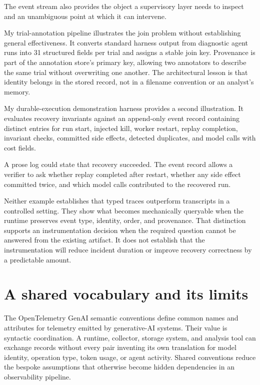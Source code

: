 The event stream also provides the object a supervisory layer needs to inspect and an unambiguous point at which it can intervene.

My trial-annotation pipeline illustrates the join problem without establishing general effectiveness. It converts standard harness output from diagnostic agent runs into 31 structured fields per trial and assigns a stable join key. Provenance is part of the annotation store's primary key, allowing two annotators to describe the same trial without overwriting one another. The architectural lesson is that identity belongs in the stored record, not in a filename convention or an analyst's memory.

My durable-execution demonstration harness provides a second illustration. It evaluates recovery invariants against an append-only event record containing distinct entries for run start, injected kill, worker restart, replay completion, invariant checks, committed side effects, detected duplicates, and model calls with cost fields.

A prose log could state that recovery succeeded. The event record allows a verifier to ask whether replay completed after restart, whether any side effect committed twice, and which model calls contributed to the recovered run.

Neither example establishes that typed traces outperform transcripts in a controlled setting. They show what becomes mechanically queryable when the runtime preserves event type, identity, order, and provenance. That distinction supports an instrumentation decision when the required question cannot be answered from the existing artifact. It does not establish that the instrumentation will reduce incident duration or improve recovery correctness by a predictable amount.

\section{A shared vocabulary and its limits}\label{a-shared-vocabulary-and-its-limits}

The OpenTelemetry GenAI semantic conventions define common names and attributes for telemetry emitted by generative-AI systems. Their value is syntactic coordination. A runtime, collector, storage system, and analysis tool can exchange records without every pair inventing its own translation for model identity, operation type, token usage, or agent activity. Shared conventions reduce the bespoke assumptions that otherwise become hidden dependencies in an observability pipeline.

